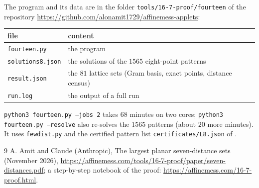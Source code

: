 \documentclass[11pt]{amsart}
\theoremstyle{remark}
\begin{document}
The program and its data are in the folder \texttt{tools/16-7-proof/fourteen} of the repository
\url{https://github.com/alonamit1729/affinemess-applets}:

\begin{center}
\begin{tabular}{@{}ll@{}}
\toprule
file & content \\
\midrule
\texttt{fourteen.py} & the program \\
\texttt{solutions8.json} & the solutions of the $1565$ eight-point patterns \\
\texttt{result.json} & the $81$ lattice sets (Gram basis, exact points, distance census) \\
\texttt{run.log} & the output of a full run \\
\bottomrule
\end{tabular}
\end{center}

\medskip
\noindent\texttt{python3 fourteen.py --jobs 2} takes $68$ minutes on two cores;
\texttt{python3 fourteen.py --resolve} also re-solves the $1565$ patterns (about $20$ more minutes). It uses
\texttt{fewdist.py} and the certified pattern list \texttt{certificates/L8.json} of \cite{AC}.

\begin{thebibliography}{9}
 A. Amit and Claude (Anthropic), The largest planar seven-distance sets (November 2026),
  \url{https://affinemess.com/tools/16-7-proof/paper/seven-distances.pdf}; a step-by-step notebook of the
  proof: \url{https://affinemess.com/16-7-proof.html}.
\end{thebibliography}
\end{document}
